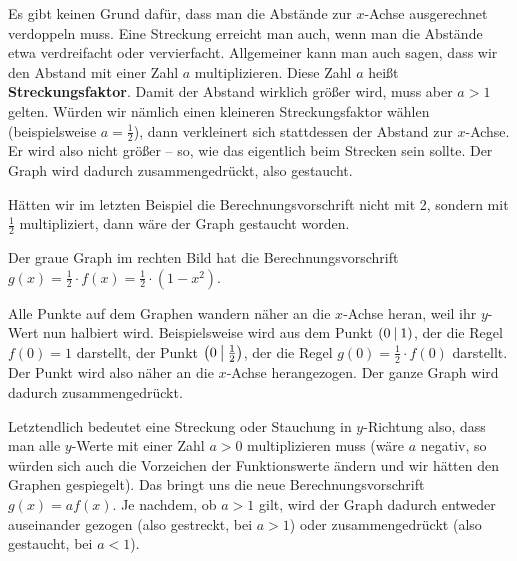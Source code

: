 \documentclass[../../main.tex]{subfiles}
\begin{document}
Es gibt keinen Grund dafür, dass man die Abstände zur $x$-Achse ausgerechnet verdoppeln muss. Eine Streckung erreicht man auch, wenn man die Abstände etwa verdreifacht oder vervierfacht. Allgemeiner kann man auch sagen, dass wir den Abstand mit einer Zahl $a$ multiplizieren. Diese Zahl $a$ heißt \textbf{Streckungsfaktor}. Damit der Abstand wirklich größer wird, muss aber $a>1$ gelten. Würden wir nämlich einen kleineren Streckungsfaktor wählen (beispielsweise $a=\frac{1}{2}$), dann verkleinert sich stattdessen der Abstand zur $x$-Achse. Er wird also nicht größer -- so, wie das eigentlich beim Strecken sein sollte. Der Graph wird dadurch zusammengedrückt, also gestaucht.

\begin{example}
    
    Hätten wir im letzten Beispiel die Berechnungsvorschrift nicht mit 2, sondern mit $\frac{1}{2}$ multipliziert, dann wäre der Graph gestaucht worden.
    
    Der graue Graph im rechten Bild hat die Berechnungsvorschrift $g(x)=\frac{1}{2}\cdot f(x)=\frac{1}{2}\cdot (1-x^2)$.
    
    Alle Punkte auf dem Graphen wandern näher an die $x$-Achse heran, weil ihr $y$-Wert nun halbiert wird. 
    Beispielsweise wird aus dem Punkt $\left(0 \:\middle|\: 1\right)$, der die Regel $f(0)=1$ darstellt, der Punkt $\left(0 \:\middle|\: \frac{1}{2}\right)$, der die Regel $g(0)=\frac{1}{2}\cdot f(0)$ darstellt. Der Punkt wird also näher an die $x$-Achse herangezogen. Der ganze Graph wird dadurch zusammengedrückt.
\end{example}

Letztendlich bedeutet eine Streckung oder Stauchung in $y$-Richtung also, dass man alle $y$-Werte mit einer Zahl $a>0$ multiplizieren muss (wäre $a$ negativ, so würden sich auch die Vorzeichen der Funktionswerte ändern und wir hätten den Graphen gespiegelt). Das bringt uns die neue Berechnungsvorschrift $g(x)=af(x)$. Je nachdem, ob $a>1$ gilt, wird der Graph dadurch entweder auseinander gezogen (also gestreckt, bei $a>1$) oder zusammengedrückt (also gestaucht, bei $a<1$).
\end{document}
